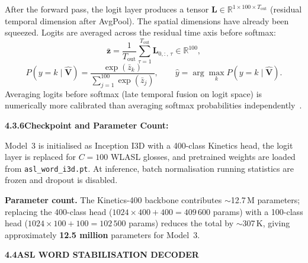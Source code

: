 \noindent After the forward pass, the logit layer produces a tensor $\mathbf{L} \in \mathbb{R}^{1 \times 100 \times T_{\text{out}}}$ (residual temporal dimension after AvgPool). The spatial dimensions have already been squeezed. Logits are averaged across the residual time axis before softmax:
\begin{equation}
\bar{\mathbf{z}} = \frac{1}{T_{\text{out}}} \sum_{\tau=1}^{T_{\text{out}}} \mathbf{L}_{0,:,\,\tau} \in \mathbb{R}^{100},
\label{eq:ch4-temporal-mean}
\end{equation}
\begin{equation}
P(y{=}k \mid \hat{\mathbf{V}}) = \frac{\exp(\bar{z}_k)}{\displaystyle\sum_{j=1}^{100} \exp(\bar{z}_j)}, \qquad \hat{y} = \arg\max_k P(y{=}k \mid \hat{\mathbf{V}}).
\label{eq:ch4-i3d-softmax}
\end{equation}
Averaging logits before softmax (late temporal fusion on logit space) is numerically more calibrated than averaging softmax probabilities independently~\cite{li2020wlasl}.\par\vspace{0.3cm}
\clearpage
\noindent\textbf{4.3.6\quad Checkpoint and Parameter Count:}\par
{}
\vspace{0.3cm}

\noindent Model~3 is initialised as Inception I3D with a 400-class Kinetics head, the logit layer is replaced for $C{=}100$ WLASL glosses, and pretrained weights are loaded from \texttt{asl\_word\_i3d.pt}. At inference, batch normalisation running statistics are frozen and dropout is disabled.\par\vspace{0.2cm}

\noindent\textbf{Parameter count.} The Kinetics-400 backbone contributes $\sim$12.7\,M parameters; replacing the 400-class head ($1024 \times 400 + 400 = 409\,600$ params) with a 100-class head ($1024 \times 100 + 100 = 102\,500$ params) reduces the total by $\sim$307\,K, giving approximately \textbf{12.5 million} parameters for Model~3.\par\vspace{0.6cm}

\noindent\textbf{4.4\quad ASL WORD STABILISATION DECODER}\par
{}
\vspace{0.4cm}

